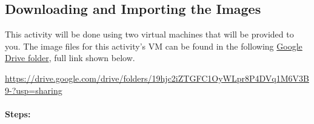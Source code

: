 \documentclass[letterpaper,12pt]{report}
\begin{document}
\newpage
\subsection*{Downloading and Importing the Images}

This activity will be done using two virtual machines that will be provided to you. The image files for this activity's VM can be found in the following \href{https://drive.google.com/drive/folders/19hjc2iZTGFC1OyWLpr8P4DVq1M6V3B9-?usp=sharing}{Google Drive folder}, full link shown below.

\url{https://drive.google.com/drive/folders/19hjc2iZTGFC1OyWLpr8P4DVq1M6V3B9-?usp=sharing}

\paragraph*{Steps:}
\end{document}
